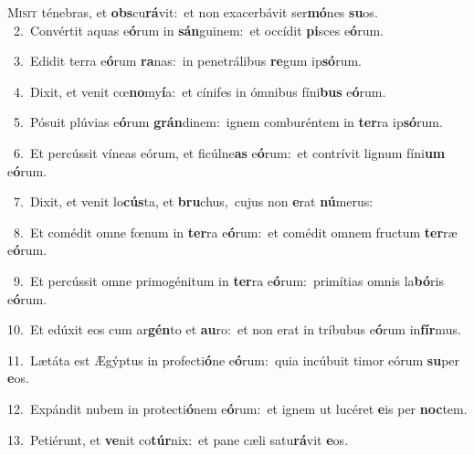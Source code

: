 \lettrine{\initial\textcolor{\initialcolor}{M}}{isit} ténebras, et \textbf{obs}\-cu\-\textbf{rá}\-vit:~\star et non exacerbávit ser\-\textbf{mó}\-nes \textbf{su}\-os.\\
{\numbfont\textcolor{\numbcolor}{~2.}}~Convértit aquas e\-\textbf{ó}\-rum in \textbf{sán}\-guinem:~\star et occídit \textbf{pi}\-sces e\-\textbf{ó}\-rum.\par
{\numbfont\textcolor{\numbcolor}{~3.}}~Edidit terra e\-\textbf{ó}\-rum \textbf{ra}\-nas:~\star in penetrálibus \textbf{re}\-gum ip\-\textbf{só}\-rum.\par
{\numbfont\textcolor{\numbcolor}{~4.}}~Dixit, et venit cœ\-\textbf{no}\-my\-\textbf{í}\-a:~\star et cínifes in ómnibus fíni\textbf{bus} e\-\textbf{ó}\-rum.\par
{\numbfont\textcolor{\numbcolor}{~5.}}~Pósuit plúvias e\-\textbf{ó}\-rum \textbf{grán}\-dinem:~\star ignem comburéntem in \textbf{ter}\-ra ip\-\textbf{só}\-rum.\par
{\numbfont\textcolor{\numbcolor}{~6.}}~Et percússit víneas eórum, et ficúlne\textbf{as} e\-\textbf{ó}\-rum:~\star et contrívit lignum fíni\textbf{um} e\-\textbf{ó}\-rum.\par
{\numbfont\textcolor{\numbcolor}{~7.}}~Dixit, et venit lo\-\textbf{cús}\-ta, et \textbf{bru}\-chus,~\star cujus non \textbf{e}\-rat \textbf{nú}\-merus:\par
{\numbfont\textcolor{\numbcolor}{~8.}}~Et comédit omne fœnum in \textbf{ter}\-ra e\-\textbf{ó}\-rum:~\star et comédit omnem fructum \textbf{ter}\-ræ e\-\textbf{ó}\-rum.\par
{\numbfont\textcolor{\numbcolor}{~9.}}~Et percússit omne primogénitum in \textbf{ter}\-ra e\-\textbf{ó}\-rum:~\star primítias omnis la\-\textbf{bó}\-ris e\-\textbf{ó}\-rum.\par
{\numbfont\textcolor{\numbcolor}{10.}}~Et edúxit eos cum ar\-\textbf{gén}\-to et \textbf{au}\-ro:~\star et non erat in tríbubus e\-\textbf{ó}\-rum in\-\textbf{fír}\-mus.\par
{\numbfont\textcolor{\numbcolor}{11.}}~Lætáta est Ægýptus in profecti\-\textbf{ó}\-ne e\-\textbf{ó}\-rum:~\star quia incúbuit timor eórum \textbf{su}\-per \textbf{e}\-os.\par
{\numbfont\textcolor{\numbcolor}{12.}}~Expándit nubem in protecti\-\textbf{ó}\-nem e\-\textbf{ó}\-rum:~\star et ignem ut lucéret \textbf{e}\-is per \textbf{noc}\-tem.\par
{\numbfont\textcolor{\numbcolor}{13.}}~Petiérunt, et \textbf{ve}\-nit co\-\textbf{túr}\-nix:~\star et pane cæli satu\-\textbf{rá}\-vit \textbf{e}\-os.\par
